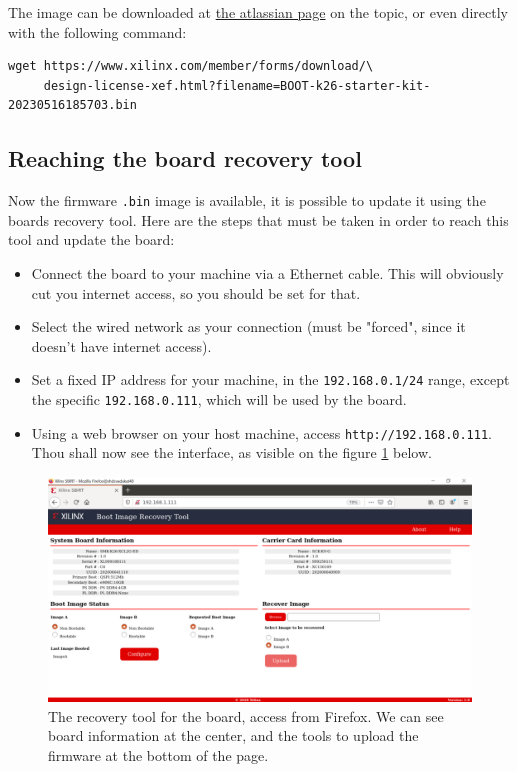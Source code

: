 \documentclass[10pt]{article}
\begin{document}
The image can be downloaded at \href{https://xilinx-wiki.atlassian.net/wiki/spaces/A/pages/1641152513/Kria+K26+ SOMoot-FW-update-with-xmutil}{the atlassian page} on the topic,
or even directly with the following command:

\begin{verbatim}
wget https://www.xilinx.com/member/forms/download/\
     design-license-xef.html?filename=BOOT-k26-starter-kit-20230516185703.bin
\end{verbatim}


\subsection{Reaching the board recovery tool}
\label{sec:org4e82238}
Now the firmware \texttt{.bin} image is available, it is possible to update it using the
boards recovery tool. Here are the steps that must be taken in order to reach
this tool and update the board:

\begin{itemize}
\item Connect the board to your machine via a Ethernet cable.
This will obviously cut you internet access, so you should be set for that.
\item Select the wired network as your connection (must be "forced", since it
doesn't have internet access).
\item Set a fixed IP address for your machine, in the \texttt{192.168.0.1/24}
range, except the specific \texttt{192.168.0.111}, which will be used by the
board.
\item Using a web browser on your host machine, access
\texttt{http://192.168.0.111}. Thou shall now see the interface, as visible on
the figure \ref{fig:org5263359} below.
\end{itemize}

\begin{figure}[htbp]
\centering
\includegraphics[width=1\textwidth]{img/recovery.png}
\caption{\label{fig:org5263359}The recovery tool for the board, access from Firefox. We can see board information at the center, and the tools to upload the firmware at the bottom of the page.}
\end{figure}
\end{document}
